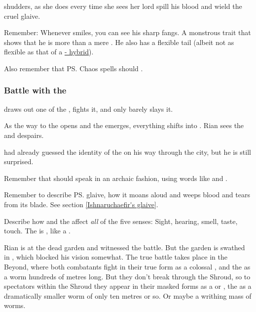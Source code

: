 \begin{garbage}

\Criseis{} shudders, as she does every time she sees her lord spill his blood and wield the cruel glaive. 

Remember: Whenever \Ishnaruchaefir{} smiles, you can see his sharp fangs. A monstrous trait that shows that he is more than a mere \scatha. He also has a flexible tail (albeit not as flexible as that of a \hyperref[Naga-Scatha hybrids]{\naga-\scatha{} hybrid}).

Also remember that \ps{\Ishnaruchaefir} Chaos spells should . 







\subsubsection{Battle with the \ghobal}
\Ishnaruchaefir{} draws out one of the \ghobaleth, fights it, and only barely slays it. 

As the way to the \Nyx{} opens and the \ghobal{} emerges, everything shifts into \Nyx. Rian sees the  and despairs.

\Ishnaruchaefir{} had already guessed the identity of the \ghobal{} on his way through the city, but he is still surprised. 

Remember that \Ishnaruchaefir{} should speak in an archaic fashion, using words like  and .

Remember to describe \ps{\Ishnaruchaefir} glaive, how it moans aloud and weeps blood and tears from its blade. See section \ref{Ishnaruchaefir's glaive}. 

Describe how \Ishnaruchaefir{} and the \ghobal{} affect \emph{all} of the five senses: Sight, hearing, smell, taste, touch. The \ghobal{} is , like a \bane. 

Rian is at the dead garden and witnessed the battle. But the garden is swathed in \wildfog, which blocked his vision somewhat. The true battle takes place in the Beyond, where both combatants fight in their true form\dash\Ishnaruchaefir{} as a colossal \dragon, and the \ghobal{} as a worm hundreds of metres long. But they don't break through the Shroud, so to spectators within the Shroud they appear in their masked forms\dash\Ishnaruchaefir{} as a \scatha{} or \rachyth, the \ghobal{} as a dramatically smaller worm of only ten metres or so. Or maybe a writhing mass of worms. 


\end{garbage}
